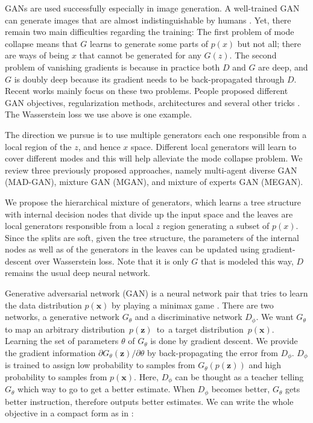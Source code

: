 \documentclass[a4paper,onesided,12pt]{report}
\begin{document}
GANs are used successfully especially in image generation. A well-trained GAN can generate images that are almost indistinguishable by humans \cite{stylegan}. Yet, there remain two main difficulties regarding the training: The first problem of mode collapse means that $G$ learns to generate some parts of $p(x)$ but not all; there are ways of being $x$ that cannot be generated for any $G(z)$. The second problem of vanishing gradients is because in practice both $D$ and $G$ are deep, and $G$ is doubly deep because its gradient needs to be back-propagated through $D$. Recent works mainly focus on these two problems. People proposed different GAN objectives, regularization methods, architectures and several other tricks \cite{ganreview}. The Wasserstein loss we use above is one example. 

The direction we pursue is to use multiple generators each one responsible from a local region of the $z$, and hence $x$ space. Different local generators will learn to cover different modes and this will help alleviate the mode collapse problem. We review three previously proposed approaches, namely multi-agent diverse GAN (MAD-GAN)\cite{madgan}, mixture GAN (MGAN)\cite{mgan}, and mixture of experts GAN (MEGAN)\cite{megan}. 

We propose the hierarchical mixture of generators, which learns a tree structure with internal decision nodes that divide up the input space and the leaves are local generators responsible from a local $z$ region generating a subset of $p(x)$. Since the splits are soft, given the tree structure, the parameters of the internal nodes as well as of the generators in the leaves can be updated using gradient-descent over Wasserstein loss. Note that it is only $G$ that is modeled this way, $D$ remains the usual deep neural network.

Generative adversarial network (GAN) is a neural network pair that tries to learn the data distribution $p(\boldsymbol{x})$ by playing a minimax game \cite{gan}. There are two networks, a generative network $G_{\theta}$ and a discriminative network $D_{\phi}$. We want $G_{\theta}$ to map an arbitrary distribution~$p(\boldsymbol{z})$~to~a target distribution~$p(\boldsymbol{x})$. Learning the set of parameters $\theta$ of $G_{\theta}$ is done by gradient descent. We provide the gradient information $\partial{G_{\theta}(\boldsymbol{z})} / \partial{\theta}$ by back-propagating the error from $D_{\phi}$. $D_{\phi}$ is trained to assign low probability to samples from $G_{\theta}(p(\boldsymbol{z}))$ and high probability to samples from $p(\boldsymbol{x})$. Here, $D_{\phi}$ can be thought as a teacher telling $G_{\theta}$ which way to go to get a better estimate. When $D_{\phi}$ becomes better, $G_{\theta}$ gets better instruction, therefore outputs better estimates. We can write the whole objective in a compact form as in \cite{gan}:
\end{document}
